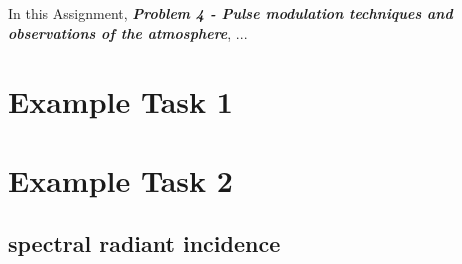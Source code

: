 

In this Assignment, \textit{\textbf{Problem 4 - Pulse modulation techniques and observations of the atmosphere}}, ...


\section{Example Task 1}



\section{Example Task 2}

\subsection{spectral radiant incidence}
